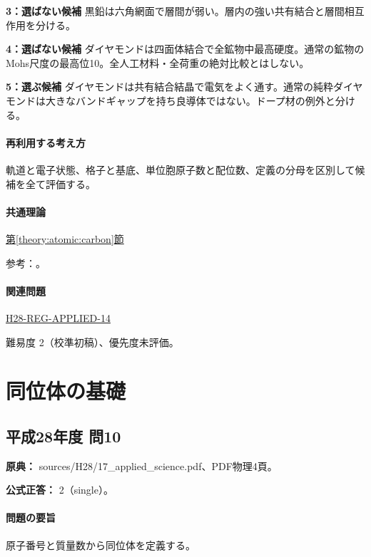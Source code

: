 \noindent\textbf{3：選ばない候補} 黒鉛は六角網面で層間が弱い。層内の強い共有結合と層間相互作用を分ける。\par

\noindent\textbf{4：選ばない候補} ダイヤモンドは四面体結合で全鉱物中最高硬度。通常の鉱物のMohs尺度の最高位10。全人工材料・全荷重の絶対比較とはしない。\par

\noindent\textbf{5：選ぶ候補} ダイヤモンドは共有結合結晶で電気をよく通す。通常の純粋ダイヤモンドは大きなバンドギャップを持ち良導体ではない。ドープ材の例外と分ける。\par

\paragraph{再利用する考え方} 軌道と電子状態、格子と基底、単位胞原子数と配位数、定義の分母を区別して候補を全て評価する。

\paragraph{共通理論} \hyperref[theory:atomic:carbon]{第\ref*{theory:atomic:carbon}節}

\par 参考：\cite{atomic_cnt,atomic_diamond}。

\paragraph{関連問題} \hyperref[q:h28-reg-applied-14]{H28-REG-APPLIED-14}

\par 難易度 2（校準初稿）、優先度未評価。

\section{同位体の基礎}

\subsection{平成28年度 問10}
\label{q:h28-reg-applied-10}

\noindent\textbf{原典：} sources/H28/17\_applied\_science.pdf、PDF物理4頁。

\textbf{公式正答：} 2（single）。

\paragraph{問題の要旨} 原子番号と質量数から同位体を定義する。

